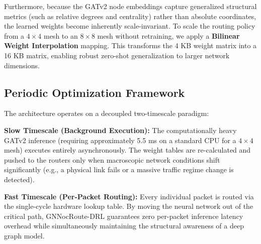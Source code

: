 Furthermore, because the GATv2 node embeddings capture generalized structural metrics (such as relative degrees and centrality) rather than absolute coordinates, the learned weights become inherently scale-invariant. To scale the routing policy from a $4\times4$ mesh to an $8\times8$ mesh without retraining, we apply a \textbf{Bilinear Weight Interpolation} mapping. This transforms the 4 KB weight matrix into a 16 KB matrix, enabling robust zero-shot generalization to larger network dimensions.

\subsection{Periodic Optimization Framework}

The architecture operates on a decoupled two-timescale paradigm:

\textbf{Slow Timescale (Background Execution):} The computationally heavy GATv2 inference (requiring approximately 5.5 ms on a standard CPU for a $4\times4$ mesh) executes entirely asynchronously. The weight tables are re-calculated and pushed to the routers only when macroscopic network conditions shift significantly (e.g., a physical link fails or a massive traffic regime change is detected).

\textbf{Fast Timescale (Per-Packet Routing):} Every individual packet is routed via the single-cycle hardware lookup table. By moving the neural network out of the critical path, GNNocRoute-DRL guarantees zero per-packet inference latency overhead while simultaneously maintaining the structural awareness of a deep graph model.

